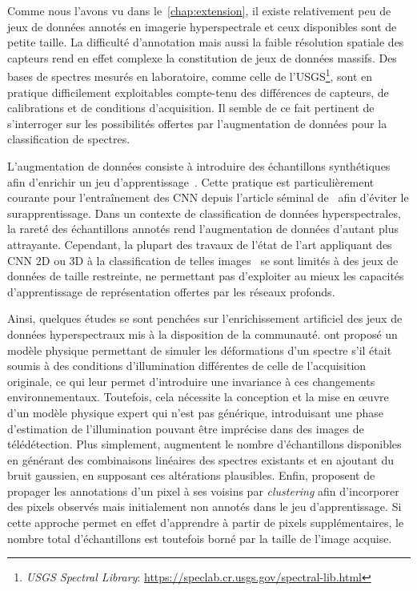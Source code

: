 Comme nous l'avons vu dans le~\cref{chap:extension}, il existe relativement peu de jeux de données annotés en imagerie hyperspectrale et ceux disponibles sont de petite taille. La difficulté d'annotation mais aussi la faible résolution spatiale des capteurs rend en effet complexe la constitution de jeux de données massifs. Des bases de spectres mesurés en laboratoire, comme celle de l'\gls{USGS}\footnote{\emph{USGS Spectral Library}: \url{https://speclab.cr.usgs.gov/spectral-lib.html}}, sont en pratique difficilement exploitables compte-tenu des différences de capteurs, de calibrations et de conditions d'acquisition. Il semble de ce fait pertinent de s'interroger sur les possibilités offertes par l'augmentation de données pour la classification de spectres.

L'augmentation de données consiste à introduire des échantillons synthétiques afin d'enrichir un jeu d'apprentissage~\cite{dyk_art_2012}. Cette pratique est particulièrement courante pour l'entraînement des \gls{CNN} depuis l'article séminal de~\citet{krizhevsky_imagenet_2012} afin d'éviter le surapprentissage. Dans un contexte de classification de données hyperspectrales, la rareté des échantillons annotés rend l'augmentation de données d'autant plus attrayante. Cependant, la plupart des travaux de l'état de l'art appliquant des \gls{CNN} 2D ou 3D à la classification de telles images~\cite{chen_deep_2016,makantasis_deep_2015,slavkovikj_hyperspectral_2015,lee_contextual_2016} se sont limités à des jeux de données de taille restreinte, ne permettant pas d'exploiter au mieux les capacités d'apprentissage de représentation offertes par les réseaux profonds.

Ainsi, quelques études se sont penchées sur l'enrichissement artificiel des jeux de données hyperspectraux mis à la disposition de la communauté. \citet{windrim_hyperspectral_2016} ont proposé un modèle physique permettant de simuler les déformations d'un spectre s'il était soumis à des conditions d'illumination différentes de celle de l'acquisition originale, ce qui leur permet d'introduire une invariance à ces changements environnementaux. Toutefois, cela nécessite la conception et la mise en \oe{}uvre d'un modèle physique expert qui n'est pas générique, introduisant une phase d'estimation de l'illumination pouvant être imprécise dans des images de télédétection. Plus simplement, \citet{chen_deep_2016} augmentent le nombre d'échantillons disponibles en générant des combinaisons linéaires des spectres existants et en ajoutant du bruit gaussien, en supposant ces altérations plausibles. Enfin, \citet{acquarelli_convolutional_2017} proposent de propager les annotations d'un pixel à ses voisins par \emph{clustering} afin d'incorporer des pixels observés mais initialement non annotés dans le jeu d'apprentissage. Si cette approche permet en effet d'apprendre à partir de pixels supplémentaires, le nombre total d'échantillons est toutefois borné par la taille de l'image acquise.

